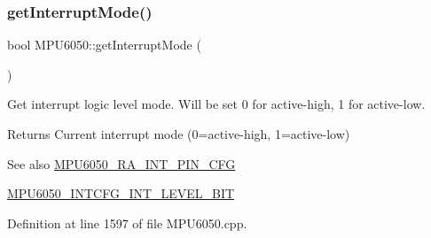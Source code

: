 \begin{DoxyCode}{0}

\end{DoxyCode}
\mbox{\label{classMPU6050_a58da1dfb39eb34e3a09a9b0bf4d87f29}} 
\subsubsection{\texorpdfstring{getInterruptMode()}{getInterruptMode()}}
{\footnotesize\ttfamily bool M\+P\+U6050\+::get\+Interrupt\+Mode (\begin{DoxyParamCaption}{ }\end{DoxyParamCaption})}

Get interrupt logic level mode. Will be set 0 for active-\/high, 1 for active-\/low. \begin{DoxyReturn}{Returns}
Current interrupt mode (0=active-\/high, 1=active-\/low) 
\end{DoxyReturn}
\begin{DoxySeeAlso}{See also}
\mbox{\hyperlink{MPU6050_8h_a82344e1daef2bac2e0d938319528be6c}{M\+P\+U6050\+\_\+\+R\+A\+\_\+\+I\+N\+T\+\_\+\+P\+I\+N\+\_\+\+C\+FG}} 

\mbox{\hyperlink{MPU6050_8h_a0ca358b8171fd08fd631434ee8ff2339}{M\+P\+U6050\+\_\+\+I\+N\+T\+C\+F\+G\+\_\+\+I\+N\+T\+\_\+\+L\+E\+V\+E\+L\+\_\+\+B\+IT}} 
\end{DoxySeeAlso}


Definition at line 1597 of file M\+P\+U6050.\+cpp.


